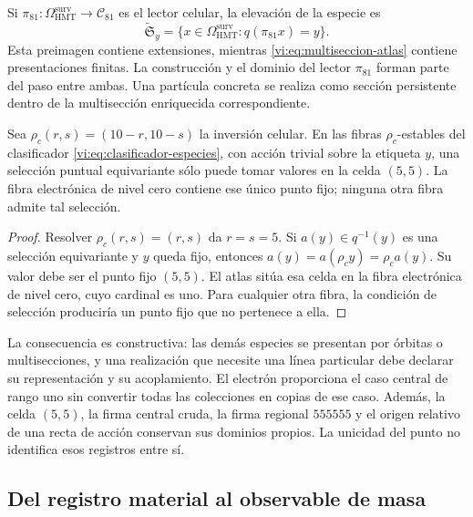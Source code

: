 Si $\pi_{81}:\Omega^{\mathrm{surv}}_{\mathrm{HMT}}\to
\mathcal C_{81}$ es el lector celular, la elevación de la especie es
\begin{equation}
 \widetilde{\mathfrak S}_y
 =\{x\in\Omega^{\mathrm{surv}}_{\mathrm{HMT}}:
                  q(\pi_{81}x)=y\}.
 \label{vi:eq:multiseccion-enriquecida}
\end{equation}
Esta preimagen contiene extensiones, mientras
\eqref{vi:eq:multiseccion-atlas} contiene presentaciones finitas. La
construcción y el dominio del lector $\pi_{81}$ forman parte del paso
entre ambas. Una partícula concreta se realiza como sección persistente
dentro de la multisección enriquecida correspondiente.

\begin{theorem}
\label{vi:thm:selector-central}
Sea $\rho_c(r,s)=(10-r,10-s)$ la inversión celular. En las fibras
$\rho_c$-estables del clasificador \eqref{vi:eq:clasificador-especies},
con acción trivial sobre la etiqueta $y$, una selección puntual
equivariante sólo puede tomar valores en la celda $(5,5)$. La fibra
electrónica de nivel cero contiene ese único punto fijo; ninguna otra
fibra admite tal selección.
\end{theorem}
\begin{proof}
Resolver $\rho_c(r,s)=(r,s)$ da $r=s=5$. Si $a(y)\in q^{-1}(y)$
es una selección equivariante y $y$ queda fijo, entonces
$a(y)=a(\rho_c y)=\rho_c a(y)$. Su valor debe ser el punto fijo
$(5,5)$. El atlas sitúa esa celda en la fibra electrónica de nivel
cero, cuyo cardinal es uno. Para cualquier otra fibra, la condición
de selección produciría un punto fijo que no pertenece a ella.
\end{proof}

La consecuencia es constructiva: las demás especies se presentan por
órbitas o multisecciones, y una realización que necesite una línea
particular debe declarar su representación y su acoplamiento. El
electrón proporciona el caso central de rango uno sin convertir todas
las colecciones en copias de ese caso. Además, la celda $(5,5)$, la firma
central cruda, la firma regional $555555$ y el origen relativo de una
recta de acción conservan sus dominios propios. La unicidad del punto
no identifica esos registros entre sí.

\subsection{Del registro material al observable de masa}
\label{vi:subsec:particula-observable}

